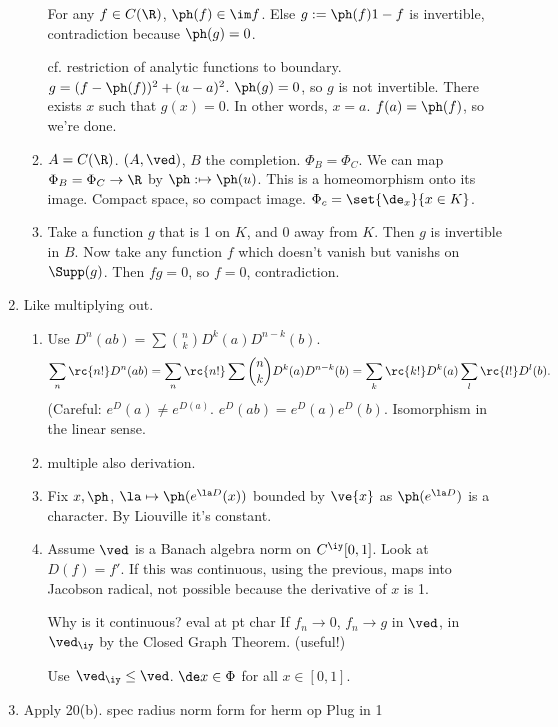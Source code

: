 \begin{enumerate}
\begin{enumerate}
For any $f\in C(\R)$, $\ph(f)\in \im f$. Else $g:=\ph(f)1-f$ is invertible, contradiction because $\ph(g)=0$. %

cf. restriction of analytic functions to boundary.
$g=(f-\ph(f))^2+(u-a)^2$. $\ph(g)=0$, so $g$ is not invertible. There exists $x$ such that $g(x)=0$.  In other words, $x=a$. $f(a)=\ph(f)$, so we're done.
\item
$A=C(\R)$. $(A,\ved)$, $B$ the completion. $\Phi_B=\Phi_C$. %
We can map $\Phi_B=\Phi_C\to \R$ by $\ph:\mapsto \ph(u)$. This is a homeomorphism onto its image. Compact space, so compact image.
$\Phi_c=\set{\de_x}{x\in K}$.
\item
Take a function $g$ that is 1 on $K$, and 0 away from $K$. Then $g$ is invertible in $B$. Now take any function $f$ which doesn't vanish but vanishs on $\Supp(g)$. Then $fg=0$, so $f=0$, contradiction.
\end{enumerate}
\item %
Like multiplying out.
\begin{enumerate}
\item Use $D^n(ab)=\sum\binom nk D^k(a)D^{n-k}(b)$. 
\[
\sum_n\rc{n!}D^n(ab)=\sum_n\rc{n!} \sum \binom nk D^k(a)D^{n-k}(b)=\sum_k \rc{k!}D^k(a)\sum_{l}\rc{l!}D^{l}(b).
\]
(Careful: $e^D(a)\ne e^{D(a)}$.
$e^D(ab)=e^D(a)e^D(b)$. 
Isomorphism in the linear sense. 
\item %
multiple also derivation.
\item
Fix $x,\ph$, $\la\mapsto \ph(e^{\la D}(x))$ bounded by $\ve{x}$ as $\ph(e^{\la D})$ is a character. By Liouville it's constant. 
\item %
Assume $\ved$ is a Banach algebra norm on $C^{\iy}[0,1]$. Look at $D(f)=f'$. If this was continuous, using the previous, maps into Jacobson radical, not possible because the derivative of $x$ is 1. 

Why is it continuous? 
eval at pt char%
If $f_n\to 0$, $f_n\to g$ in $\ved$, in $\ved_{\iy}$ by the Closed Graph Theorem. (useful!)

Use $\ved_{\iy}\le \ved$. $\de x\in \Phi$ for all $x\in [0,1]$.  
\end{enumerate}
\item %
Apply 20(b).
spec radius norm form for herm op Plug in 1


\end{enumerate}
